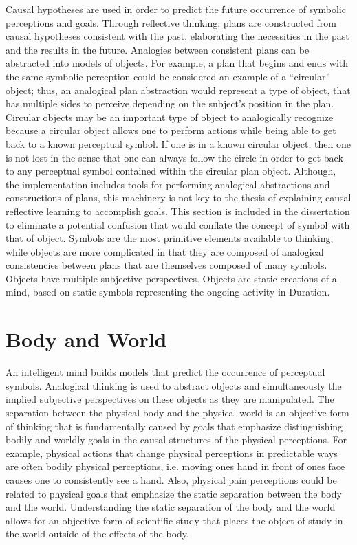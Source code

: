 Causal hypotheses are used in order to predict the future occurrence
of symbolic perceptions and goals.  Through reflective thinking, plans
are constructed from causal hypotheses consistent with the past,
elaborating the necessities in the past and the results in the future.
Analogies between consistent plans can be abstracted into models of
objects.  For example, a plan that begins and ends with the same
symbolic perception could be considered an example of a ``circular''
object; thus, an analogical plan abstraction would represent a type of
object, that has multiple sides to perceive depending on the subject's
position in the plan.  Circular objects may be an important type of
object to analogically recognize because a circular object allows one
to perform actions while being able to get back to a known perceptual
symbol.  If one is in a known circular object, then one is not lost in
the sense that one can always follow the circle in order to get back
to any perceptual symbol contained within the circular plan object.
Although, the implementation includes tools for performing analogical
abstractions and constructions of plans, this machinery is not key to
the thesis of explaining causal reflective learning to accomplish
goals.  This section is included in the dissertation to eliminate a
potential confusion that would conflate the concept of symbol with
that of object.  Symbols are the most primitive elements available to
thinking, while objects are more complicated in that they are composed
of analogical consistencies between plans that are themselves composed
of many symbols.  Objects have multiple subjective perspectives.
Objects are static creations of a mind, based on static symbols
representing the ongoing activity in Duration.

\section{Body and World}

An intelligent mind builds models that predict the occurrence of
perceptual symbols.  Analogical thinking is used to abstract objects
and simultaneously the implied subjective perspectives on these
objects as they are manipulated.  The separation between the physical
body and the physical world is an objective form of thinking that is
fundamentally caused by goals that emphasize distinguishing bodily and
worldly goals in the causal structures of the physical perceptions.
For example, physical actions that change physical perceptions in
predictable ways are often bodily physical perceptions, i.e. moving
ones hand in front of ones face causes one to consistently see a hand.
Also, physical pain perceptions could be related to physical goals
that emphasize the static separation between the body and the world.
Understanding the static separation of the body and the world allows
for an objective form of scientific study that places the object of
study in the world outside of the effects of the body.

